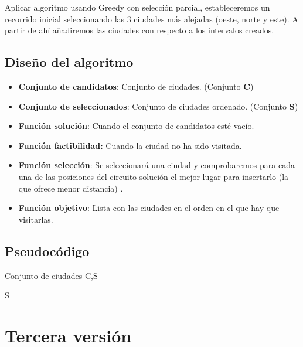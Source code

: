 		Aplicar algoritmo usando Greedy con selección parcial, estableceremos un recorrido inicial seleccionando las 3 ciudades más alejadas (oeste, norte y este). A partir de ahí añadiremos las ciudades con respecto a los intervalos creados.
		

	
	\subsection{Diseño del algoritmo} 
	
		\begin{itemize}
			\item \textbf{Conjunto de candidatos}: Conjunto de ciudades. (Conjunto \textbf{C})
			\item \textbf{Conjunto de seleccionados}: Conjunto de ciudades ordenado. (Conjunto \textbf{S})
			\item \textbf{Función solución}: Cuando el conjunto de candidatos esté vacío.
			\item \textbf{Función factibilidad:} Cuando la ciudad no ha sido visitada.
			\item \textbf{Función selección}: Se seleccionará una ciudad y comprobaremos para cada una de las posiciones del circuito solución el mejor lugar para insertarlo (la que ofrece menor distancia) .
			\item \textbf{Función objetivo}: Lista con las ciudades en el orden en el que hay que visitarlas.		
		\end{itemize}
		
	
	
	\subsection{Pseudocódigo}
			\begin{algorithmic}				
			\Require Conjunto de ciudades C,S
			\EndFor
			\EndFor  
			
			\Return S	
			
			
		\end{algorithmic}
		
	
	\section{Tercera versión} 
	
